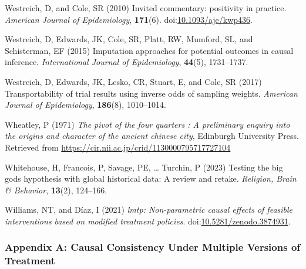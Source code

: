 \documentclass[
  singlecolumn]{article}
\newlength{\cslhangindent}
\newenvironment{CSLReferences}[2] %
 {\begin{list}{}{%
  \setlength{\itemindent}{0pt}
  \setlength{\leftmargin}{0pt}
  \setlength{\parsep}{0pt}
  \ifodd #1
   \setlength{\leftmargin}{\cslhangindent}
   \setlength{\itemindent}{-1\cslhangindent}
  \fi
  \setlength{\itemsep}{#2\baselineskip}}}
 {\end{list}}
\begin{document}
\begin{CSLReferences}{1}{0}
Westreich, D, and Cole, SR (2010) Invited commentary: positivity in
practice. \emph{American Journal of Epidemiology}, \textbf{171}(6).
doi:\href{https://doi.org/10.1093/aje/kwp436}{10.1093/aje/kwp436}.

Westreich, D, Edwards, JK, Cole, SR, Platt, RW, Mumford, SL, and
Schisterman, EF (2015) Imputation approaches for potential outcomes in
causal inference. \emph{International Journal of Epidemiology},
\textbf{44}(5), 1731--1737.

Westreich, D, Edwards, JK, Lesko, CR, Stuart, E, and Cole, SR (2017)
Transportability of trial results using inverse odds of sampling
weights. \emph{American Journal of Epidemiology}, \textbf{186}(8),
1010--1014.

Wheatley, P (1971) \emph{The pivot of the four quarters : A preliminary
enquiry into the origins and character of the ancient chinese city},
Edinburgh University Press. Retrieved from
\url{https://cir.nii.ac.jp/crid/1130000795717727104}

Whitehouse, H, Francois, P, Savage, PE, \ldots{} Turchin, P (2023)
Testing the big gods hypothesis with global historical data: A review
and retake. \emph{Religion, Brain \& Behavior}, \textbf{13}(2),
124--166.

Williams, NT, and Díaz, I (2021) \emph{{l}mtp: Non-parametric causal
effects of feasible interventions based on modified treatment policies}.
doi:\href{https://doi.org/10.5281/zenodo.3874931}{10.5281/zenodo.3874931}.

\end{CSLReferences}

\newpage{}

\subsubsection{Appendix A: Causal Consistency Under Multiple Versions of
Treatment}\label{appendix-a-causal-consistency-under-multiple-versions-of-treatment}
\end{document}
